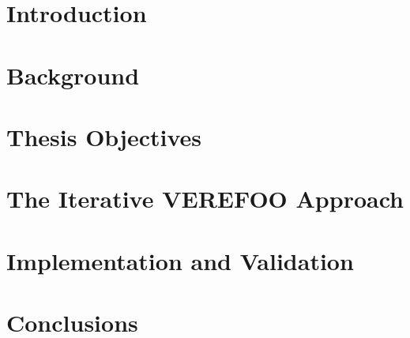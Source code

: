 
\section{Introduction}

\section{Background}

\section{Thesis Objectives}

\section{The Iterative VEREFOO Approach}

\section{Implementation and Validation}

\section{Conclusions}
